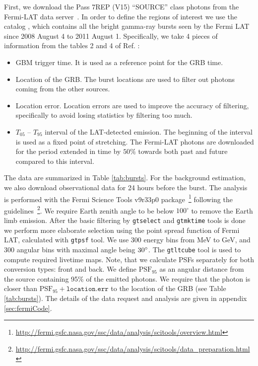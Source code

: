\documentclass[manuscript]{aastex}
\begin{document}
First, we download the Pass 7REP (V15) ``SOURCE'' class photons from
the Fermi-LAT data
server~\citep{2009ApJ...697.1071A,Ackermann:2012kna}. In order to
define the regions of interest we use the catalog
\citep{Ackermann:2013zfa}, which contains all the bright gamma-ray
bursts seen by the Fermi LAT since 2008 August 4 to 2011 August 1.
Specifically, we take 4 pieces of information from the tables 2 and 4
of Ref. \citet{Ackermann:2013zfa}:
\begin{itemize}
	\item{
		GBM trigger time.
		It is used as a reference point for the GRB time.
	}
	\item{
		Location of the GRB.
		The burst locations are used to filter out photons
                coming from the other sources.
	}
	\item{
		Location error.
		Location errors are used to improve the accuracy of filtering, specifically to avoid losing statistics by filtering too much.
	}
	\item{
		$T_{05}$ -- $T_{95}$ interval of the LAT-detected
          emission. The beginning of the interval is used as a fixed
          point of stretching. The Fermi-LAT photons are downloaded
          for the period extended in time by $50\%$ towards both past
          and future compared to this interval.
	}
\end{itemize}
The data are summarized in Table \ref{tab:bursts}. For the background
estimation, we also download observational data for 24 hours before
the burst.  The analysis is performed with the Fermi Science Tools
v9r33p0
package~\footnote{\url{http://fermi.gsfc.nasa.gov/ssc/data/analysis/scitools/overview.html}}
following the
guidelines~\footnote{\url{http://fermi.gsfc.nasa.gov/ssc/data/analysis/scitools/data_preparation.html}}.
We require Earth zenith angle to be below $100^\circ$ to remove the
Earth limb emission. After the basic filtering by \texttt{gtselect}
and \texttt{gtmktime} tools is done we perform more elaborate
selection using the point spread function of Fermi LAT, calculated
with \texttt{gtpsf} tool. We use 300 energy bins from \unit[100]{MeV}
to \unit[300]{GeV}, and 300 angular bins with maximal angle being
$30\degree$.  The \texttt{gtltcube} tool is used to compute required
livetime maps. Note, that we calculate PSFs separately for both
conversion types: front and back. We define $\mathrm{PSF}_{95}$ as an
angular distance from the source containing 95\% of the emitted
photons. We require that the photon is closer than $\mathrm{PSF}_{95}
+ \texttt{location.err}$ to the location of the GRB (see Table
\ref{tab:bursts}). The details of the data request and
analysis are given in appendix \ref{sec:fermiCode}.
\end{document}
